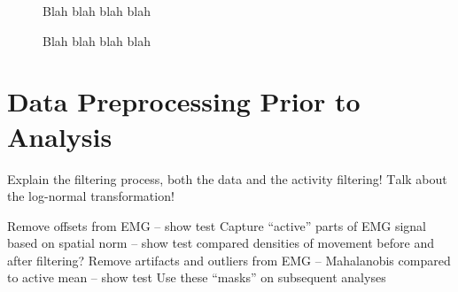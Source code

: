 \documentclass[../main.tex]{subfiles}
\begin{document}
\begin{figure}[H]
  \caption{Blah blah blah blah}\label{fig:behavior}
\end{figure}

\begin{figure}[H]
  \caption{Blah blah blah blah}\label{fig:behavior}
\end{figure}


\section{Data Preprocessing Prior to Analysis}

Explain the filtering process, both the data and the activity filtering! Τalk about the log-normal transformation!


Remove offsets from EMG – show test
Capture “active” parts of EMG signal based on spatial norm – show test compared densities of movement before and after filtering?
Remove artifacts and outliers from EMG – Mahalanobis compared to active mean – show test
Use these “masks” on subsequent analyses



\end{document}
